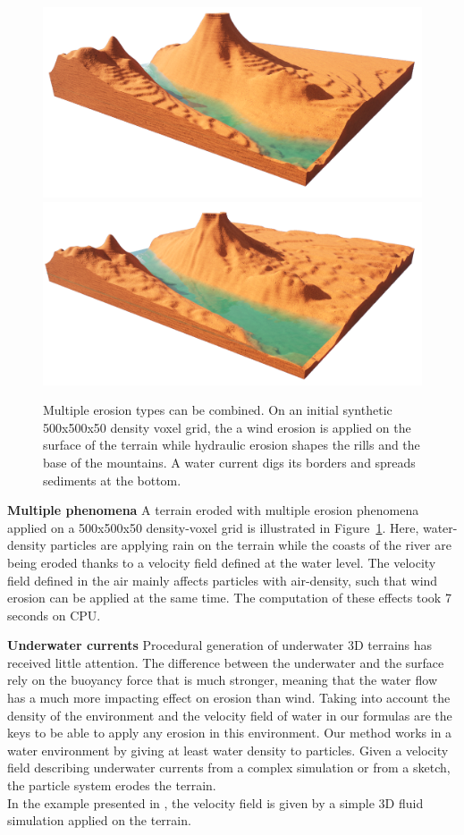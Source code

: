 \begin{figure}[b]
    \centering
    \includegraphics[width=0.49\linewidth]{Results/MultiEffects_base.png}
    \includegraphics[width=0.49\linewidth]{Results/MultiEffects.png}
    \caption{Multiple erosion types can be combined. On an initial synthetic 500x500x50 density voxel grid, the a wind erosion is applied on the surface of the terrain while hydraulic erosion shapes the rills and the base of the mountains. A water current digs its borders and spreads sediments at the bottom. }
    \label{fig:erosion_multiErosions}
\end{figure}
\textbf{Multiple phenomena} A terrain eroded with multiple erosion phenomena applied on a 500x500x50 density-voxel grid is illustrated in Figure~\ref{fig:erosion_multiErosions}. Here, water-density particles are applying rain on the terrain while the coasts of the river are being eroded thanks to a velocity field defined at the water level. The velocity field defined in the air mainly affects particles with air-density, such that wind erosion can be applied at the same time. The computation of these effects took 7 seconds on CPU.

\textbf{Underwater currents}
Procedural generation of underwater 3D terrains has received little attention. The difference between the underwater and the surface rely on the buoyancy force that is much stronger, meaning that the water flow has a much more impacting effect on erosion than wind. Taking into account the density of the environment and the velocity field of water in our formulas are the keys to be able to apply any erosion in this environment. 
Our method works in a water environment by giving at least water density to particles. Given a velocity field describing underwater currents from a complex simulation or from a sketch, the particle system erodes the terrain. \\ 
In the example presented in , the velocity field is given by a simple 3D fluid simulation \cite{Stam1999} applied on the terrain.

